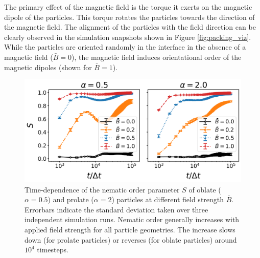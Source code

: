 The primary effect of the magnetic field is the torque it exerts on the
magnetic dipole of the particles. This torque rotates the particles
towards the direction of the magnetic field. The alignment of the
particles with the field direction can be clearly observed in the
simulation snapshots shown in Figure \ref{fig:packing_viz}. While the
particles are oriented randomly in the interface in the absence of a
magnetic field (\(\bar{B}=0\)), the magnetic field induces orientational
order of the magnetic dipoles (shown for \(\bar{B}=1\)).

\begin{figure}
\centering
\includegraphics[width=\columnwidth]{figures/results/paper1/S-vs-t.png}
\caption{Time-dependence of the nematic order parameter $S$ of oblate ($\alpha=0.5$) and prolate ($\alpha=2$) 
        particles at different field strength $\bar{B}$. Errorbars indicate the standard deviation taken over 
        three independent simulation runs. Nematic order generally increases with applied field strength for all particle geometries. 
        The increase slows down (for prolate particles) or reverses (for oblate particles) around $10^4$ timesteps.}
\label{fig:nematic_time}
\end{figure}

